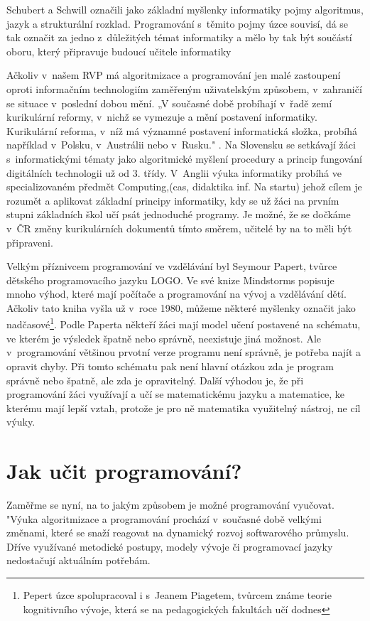 \documentclass[FP,DP]{tulthesis}
\begin{document}
{{{{{{{Schubert a Schwill \citep{didaktikderinformatik} označili jako základní myšlenky informatiky pojmy algoritmus, jazyk a strukturální rozklad. Programování s~těmito pojmy úzce souvisí, dá se tak označit za jedno z~důležitých témat informatiky a mělo by tak být součástí oboru, který připravuje budoucí učitele informatiky

Ačkoliv v~našem RVP má algoritmizace a programování jen malé zastoupení oproti informačním technologiím zaměřeným uživatelským způsobem, v~zahraničí se situace v~poslední  dobou mění. „V současné době probíhají v~řadě zemí kurikulární reformy, v~nichž se vymezuje a mění postavení informatiky. Kurikulární reforma, v~níž má významné postavení informatická složka, probíhá například v~Polsku, v~Austrálii nebo v~Rusku." \citep{nastartu}. Na Slovensku se setkávají žáci s~informatickými tématy jako algoritmické myšlení procedury a princip fungování digitálních technologii  už od 3. třídy. V~Anglii výuka informatiky probíhá ve specializovaném  předmět Computing,(cas, didaktika inf. Na startu) jehož cílem je rozumět a aplikovat základní principy informatiky, kdy se už žáci na prvním stupni základních škol učí psát jednoduché programy.  \citep{england2013}  Je možné, že se dočkáme v~ČR změny kurikulárních dokumentů tímto směrem, učitelé by na to měli být připraveni.

 Velkým příznivcem programování ve vzdělávání byl Seymour Papert, tvůrce dětského programovacího jazyku LOGO. Ve své knize Mindstorms  \citep{mindstorms}popisuje mnoho výhod, které mají  počítače a programování na vývoj a vzdělávání dětí. Ačkoliv tato kniha vyšla už v~roce 1980, můžeme některé myšlenky označit jako nadčasové\footnote{Pepert úzce spolupracoval i s~Jeanem Piagetem, tvůrcem známe teorie kognitivního vývoje, která se na pedagogických fakultách učí dodnes}. Podle Paperta někteří žáci mají model učení postavené na schématu, ve kterém je výsledek špatně nebo správně, neexistuje jiná možnost. Ale v~programování většinou prvotní verze programu není správně, je potřeba najít a opravit chyby. Při tomto schématu  pak není hlavní otázkou zda je program správně nebo špatně, ale zda je opravitelný. Další výhodou je, že při programování žáci využívají a učí se matematickému jazyku a matematice, ke kterému mají lepší vztah, protože je pro ně matematika využitelný nástroj, ne cíl výuky.



\section{Jak učit programování?}
Zaměřme se nyní, na to jakým způsobem je možné programování vyučovat. "Výuka algoritmizace a programování prochází
v~současné době velkými změnami, které se snaží reagovat na dynamický rozvoj softwarového průmyslu. Dříve využívané metodické postupy, modely vývoje či programovací jazyky nedostačují aktuálním potřebám. \citep{fojtik2013}
 
}}}}}}}
\end{document}

